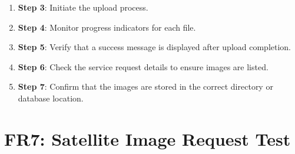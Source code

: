 \documentclass[12pt, titlepage]{article}
\begin{document}
\begin{enumerate}
\begin{itemize}
\begin{enumerate}
            \item \textbf{Step 3}: Initiate the upload process.
            \item \textbf{Step 4}: Monitor progress indicators for each file.
            \item \textbf{Step 5}: Verify that a success message is displayed after upload completion.
            \item \textbf{Step 6}: Check the service request details to ensure images are listed.
            \item \textbf{Step 7}: Confirm that the images are stored in the correct directory or database location.
        \end{enumerate}
    \end{itemize}
\end{enumerate}

\section*{FR7: Satellite Image Request Test}
\end{document}
